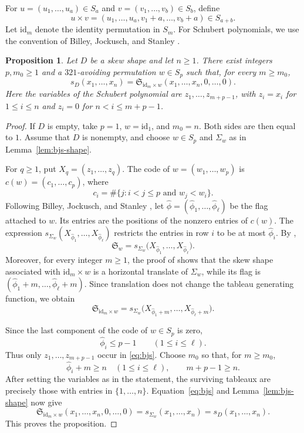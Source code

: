 \documentclass[11pt]{article}
\newtheorem{proposition}[theorem]{Proposition}
\theoremstyle{definition}
\newcommand{\Schubert}{\mathfrak S}
\begin{document}
For $u=(u_1,\ldots,u_a)\in S_a$ and
$v=(v_1,\ldots,v_b)\in S_b$, define
\[
  u\times v
  =(u_1,\ldots,u_a,v_1+a,\ldots,v_b+a)\in S_{a+b}.
\]
Let $\mathrm{id}_m$ denote the identity permutation in $S_m$.  For Schubert
polynomials, we use the convention of Billey, Jockusch, and Stanley
\cite[p.~346]{BJS}.

\begin{proposition}\label{prop:schubert}
Let $D$ be a skew shape and let $n\ge1$.  There exist integers
$p,m_0\ge1$ and a $321$-avoiding permutation $w\in S_p$ such that, for
every $m\ge m_0$,
\[
  s_D(x_1,\ldots,x_n)
  =\Schubert_{\mathrm{id}_m\times w}
   (x_1,\ldots,x_n,0,\ldots,0).
\]
Here the variables of the Schubert polynomial are
$z_1,\ldots,z_{m+p-1}$, with $z_i=x_i$ for $1\le i\le n$ and $z_i=0$
for $n<i\le m+p-1$.
\end{proposition}

\begin{proof}
If $D$ is empty, take $p=1$, $w=\mathrm{id}_1$, and $m_0=n$.  Both
sides are then equal to $1$.  Assume that $D$ is nonempty, and choose
$w\in S_p$ and $\Sigma_w$ as in Lemma~\ref{lem:bjs-shape}.

For $q\ge1$, put $X_q=(z_1,\ldots,z_q)$.  The code of
$w=(w_1,\ldots,w_p)$ is $c(w)=(c_1,\ldots,c_p)$, where
\[
  c_i=\#\{j:i<j\le p\text{ and }w_j<w_i\}.
\]
Following Billey, Jockusch, and Stanley \cite[p.~364]{BJS}, let
$\widehat\phi=(\widehat\phi_1,\ldots,\widehat\phi_\ell)$ be the flag attached
to $w$.  Its entries are the positions of the nonzero entries of $c(w)$.  The
expression $s_{\Sigma_w}(X_{\widehat\phi_1},\ldots,
X_{\widehat\phi_\ell})$ restricts the entries in row $i$ to be at most
$\widehat\phi_i$.  By \cite[Theorem~2.2]{BJS},
\[
  \Schubert_w
  =s_{\Sigma_w}\bigl(
      X_{\widehat\phi_1},\ldots,X_{\widehat\phi_\ell}
    \bigr).
\]
Moreover, for every integer $m\ge1$, the proof of
\cite[Corollary~2.4]{BJS} shows that the skew shape associated with
$\mathrm{id}_m\times w$ is a horizontal translate of $\Sigma_w$, while its flag is
$(\widehat\phi_1+m,\ldots,\widehat\phi_\ell+m)$.
Since translation does not change the tableau generating function, we obtain
\begin{equation}\label{eq:bjs}
  \Schubert_{\mathrm{id}_m\times w}
  =s_{\Sigma_w}\bigl(
      X_{\widehat\phi_1+m},\ldots,
      X_{\widehat\phi_\ell+m}
    \bigr).
\end{equation}

Since the last component of the code of $w\in S_p$ is zero,
\[
  \widehat\phi_i\le p-1
  \qquad (1\le i\le\ell).
\]
Thus only $z_1,\ldots,z_{m+p-1}$ occur in \eqref{eq:bjs}.  Choose
$m_0$ so that, for $m\ge m_0$,
\[
  \widehat\phi_i+m\ge n\quad(1\le i\le\ell),
  \qquad
  m+p-1\ge n.
\]
After setting the variables as in the statement, the surviving tableaux are
precisely those with entries in $\{1,\ldots,n\}$.  Equation~\eqref{eq:bjs} and
Lemma~\ref{lem:bjs-shape} now give
\[
  \Schubert_{\mathrm{id}_m\times w}
   (x_1,\ldots,x_n,0,\ldots,0)
  =s_{\Sigma_w}(x_1,\ldots,x_n)
  =s_D(x_1,\ldots,x_n).
\]
This proves the proposition.
\end{proof}
\end{document}
